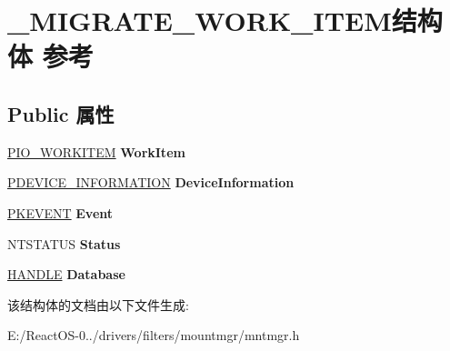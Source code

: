 \hypertarget{struct___m_i_g_r_a_t_e___w_o_r_k___i_t_e_m}{}\section{\+\_\+\+M\+I\+G\+R\+A\+T\+E\+\_\+\+W\+O\+R\+K\+\_\+\+I\+T\+E\+M结构体 参考}
\label{struct___m_i_g_r_a_t_e___w_o_r_k___i_t_e_m}
\subsection*{Public 属性}
\begin{DoxyCompactItemize}
\item 
\mbox{\label{struct___m_i_g_r_a_t_e___w_o_r_k___i_t_e_m_a3989745db237486205729333b53ca935}} 
\hyperlink{struct___i_o___w_o_r_k_i_t_e_m}{P\+I\+O\+\_\+\+W\+O\+R\+K\+I\+T\+EM} {\bfseries Work\+Item}
\item 
\mbox{\label{struct___m_i_g_r_a_t_e___w_o_r_k___i_t_e_m_a97f0da5d295963c4b2e3a3f6b547fc6d}} 
\hyperlink{struct___d_e_v_i_c_e___i_n_f_o_r_m_a_t_i_o_n}{P\+D\+E\+V\+I\+C\+E\+\_\+\+I\+N\+F\+O\+R\+M\+A\+T\+I\+ON} {\bfseries Device\+Information}
\item 
\mbox{\label{struct___m_i_g_r_a_t_e___w_o_r_k___i_t_e_m_a67b78616a00f42232235838791e04501}} 
\hyperlink{struct___k_e_v_e_n_t}{P\+K\+E\+V\+E\+NT} {\bfseries Event}
\item 
\mbox{\label{struct___m_i_g_r_a_t_e___w_o_r_k___i_t_e_m_a09ae45d2863d9b82e7ba1d5ddb97c375}} 
N\+T\+S\+T\+A\+T\+US {\bfseries Status}
\item 
\mbox{\label{struct___m_i_g_r_a_t_e___w_o_r_k___i_t_e_m_a93e481c281ba7a9096b850621056612e}} 
\hyperlink{interfacevoid}{H\+A\+N\+D\+LE} {\bfseries Database}
\end{DoxyCompactItemize}


该结构体的文档由以下文件生成\+:\begin{DoxyCompactItemize}
\item 
E\+:/\+React\+O\+S-\/0../drivers/filters/mountmgr/mntmgr.\+h\end{DoxyCompactItemize}
